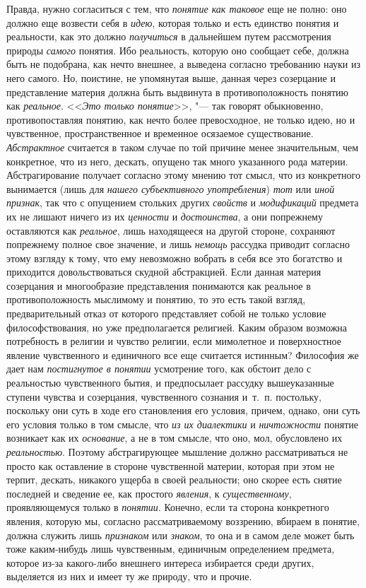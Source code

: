 {Правда, нужно согласиться с тем, что
{\em понятие как таковое}
еще не полно: оно должно еще возвести себя в
{\em идею}, которая
только и есть единство понятия и реальности, как это должно
{\em получиться} в
дальнейшем путем рассмотрения природы
{\em самого} понятия. Ибо
реальность, которую оно сообщает себе, должна быть не подобрана, как нечто
внешнее, а выведена согласно требованию науки из него самого. Но, поистине,
не упомянутая выше, данная через созерцание и представление материя должна
быть выдвинута в противоположность понятию как
{\em реальное}.
<<{\em Это только понятие}>>, "---
так говорят обыкновенно, противопоставляя понятию, как нечто
более превосходное, не только идею, но и чувственное, пространственное и
временное осязаемое существование.
{\em Абстрактное}
считается в таком случае по той причине менее значительным,
чем конкретное, что из него, дескать, опущено так много указанного рода
материи. Абстрагирование получает согласно этому мнению тот смысл, что из
конкретного вынимается (лишь для
{\em нашего субъективного
употребления}) {\em тот}
или {\em иной признак},
так что с опущением стольких других
{\em свойств} и
{\em модификаций}
предмета их не лишают ничего из их
{\em ценности} и
{\em достоинства}, а они
попрежнему оставляются как
{\em реальное}, лишь
находящееся на другой стороне, сохраняют попрежнему полное свое значение, и
лишь {\em немощь}
рассудка приводит согласно этому взгляду к тому, что ему
невозможно вобрать в себя все это богатство и приходится довольствоваться
скудной абстракцией. Если данная материя созерцания и многообразие
представления понимаются как реальное в противоположность мыслимому и
понятию, то это есть такой взгляд, предварительный отказ от которого
представляет собой не только условие философствования, но уже
предполагается религией. Каким образом возможна потребность в религии и
чувство религии, если мимолетное и поверхностное явление чувственного и
единичного все еще считается истинным? Философия же дает нам
{\em постигнутое в понятии}
усмотрение того, как обстоит дело с реальностью чувственного
бытия, и предпосылает рассудку вышеуказанные ступени чувства и созерцания,
чувственного сознания и~т.~п. постольку, поскольку они суть
в ходе его становления его условия, причем, однако, они суть его условия
только в том смысле, что {\em из их
диалектики} и
{\em ничтожности} понятие
возникает как их {\em основание},
а не в том смысле, что оно, мол, обусловлено их
{\em реальностью}.
Поэтому абстрагирующее мышление должно рассматриваться не
просто как оставление в стороне чувственной материи, которая при этом не
терпит, дескать, никакого ущерба в своей реальности; оно скорее есть снятие
последней и сведение ее, как простого
{\em явления}, к
{\em существенному},
проявляющемуся только в
{\em понятии}. Конечно,
если та сторона конкретного явления, которую мы, согласно рассматриваемому
воззрению, вбираем в понятие, должна служить лишь
{\em признаком} или
{\em знаком}, то она и в
самом деле может быть тоже каким-нибудь лишь чувственным, единичным
определением предмета, которое из-за какого-либо внешнего интереса
избирается среди других, выделяется из них и имеет ту же природу, что и
прочие.

}
